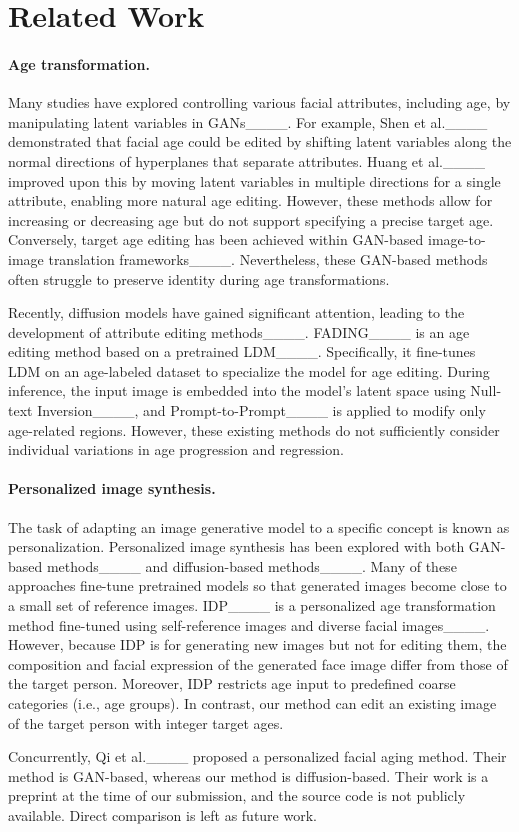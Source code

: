 \section{Related Work}
\label{sec:related}

\paragraph{Age transformation.}
Many studies have explored controlling various facial attributes, including age, by manipulating latent variables in GANs____.
For example, Shen et al.____ demonstrated that facial age could be edited by shifting latent variables along the normal directions of hyperplanes that separate attributes.
Huang et al.____ improved upon this by moving latent variables in multiple directions for a single attribute, enabling more natural age editing.
However, these methods allow for increasing or decreasing age but do not support specifying a precise target age.
Conversely, target age editing has been achieved within GAN-based image-to-image translation frameworks____.
Nevertheless, these GAN-based methods often struggle to preserve identity during age transformations.

Recently, diffusion models have gained significant attention, leading to the development of attribute editing methods____.
FADING____ is an age editing method based on a pretrained LDM____.
Specifically, it fine-tunes LDM on an age-labeled dataset to specialize the model for age editing.
During inference, the input image is embedded into the model's latent space using Null-text Inversion____, and Prompt-to-Prompt____ is applied to modify only age-related regions.
However, these existing methods do not sufficiently consider individual variations in age progression and regression.

\paragraph{Personalized image synthesis.}

The task of adapting an image generative model to a specific concept is known as personalization.
Personalized image synthesis has been explored with
both GAN-based methods____ and diffusion-based methods____.
Many of these approaches fine-tune pretrained models so that generated images become close to a small set of reference images.
IDP____ is a personalized age transformation method fine-tuned using self-reference images and diverse facial images____. 
However, because IDP is for generating new images but not for editing them, the composition and facial expression of the generated face image differ from those of the target person. Moreover, IDP restricts age input to predefined coarse categories (i.e., age groups). In contrast, our method can edit an existing image of the target person with integer target ages.

Concurrently, Qi et al.____ proposed a personalized facial aging method. Their method is GAN-based, whereas our method is diffusion-based. Their work is a preprint at the time of our submission, and the source code is not publicly available. Direct comparison is left as future work.